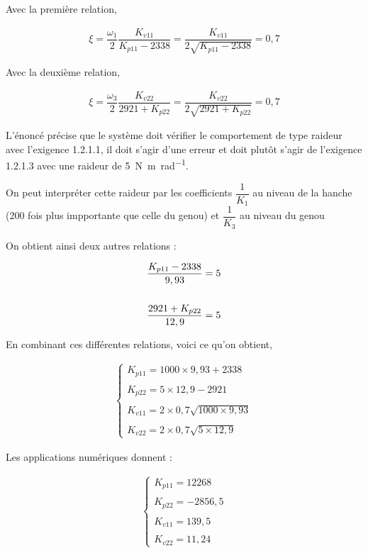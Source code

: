 \begin{corrige}
Avec la première relation,

\begin{align*}
\xi=\dfrac{\omega_1}{2}\dfrac{K_{v11}}{K_{p11}-2338}=\dfrac{K_{v11}}{2\sqrt{K_{p11}-2338}}=0,7
\end{align*}

Avec la deuxième relation,

\begin{align*}
\xi=\dfrac{\omega_3}{2}\dfrac{K_{v22}}{2921+K_{p22}}=\dfrac{K_{v22}}{2\sqrt{2921+K_{p22}}}=0,7
\end{align*}

L'énoncé précise que le système doit vérifier le comportement de type raideur avec l'exigence 1.2.1.1, il doit s'agir d'une erreur et doit plutôt s'agir de l'exigence 1.2.1.3 avec une raideur de \SI{5}{N.m.rad^{-1}}.

On peut interpréter cette raideur par les coefficients $\dfrac{1}{K_1}$ au niveau de la hanche (200 fois plus impportante que celle du genou) et $\dfrac{1}{K_3}$ au niveau du genou

On obtient ainsi deux autres relations : 

\begin{align*}
\dfrac{K_{p11}-2338}{9,93}=5\time 200\\
\\
\dfrac{2921+K_{p22}}{12,9}=5
\end{align*}

En combinant ces différentes relations, voici ce qu'on obtient,

\begin{align*}
\left\{
\begin{array}{l}
K_{p11}=1000\times 9,93+2338\\
\\
K_{p22}=5\times 12,9-2921\\
\\
K_{v11}=2\times 0,7\sqrt{1000\times 9,93}\\
\\
K_{v22}=2\times 0,7\sqrt{5\times 12,9}
\end{array}
\right.
\end{align*}

Les applications numériques donnent : 


\begin{align*}
\left\{
\begin{array}{l}
K_{p11}=12268 \\
\\
K_{p22}=-2856,5 \\
\\
K_{v11}=139,5\\
\\
K_{v22}=11,24
\end{array}
\right.
\end{align*}
\end{corrige}
\else
\fi

